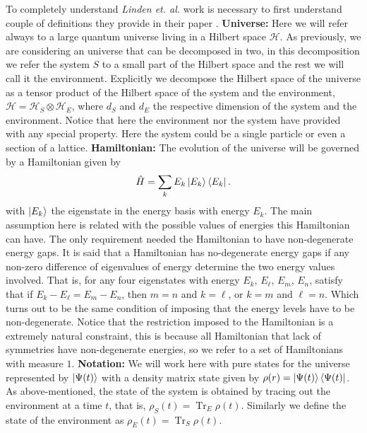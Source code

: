 \newline
To completely understand \textit{Linden et. al.} work is necessary to first understand couple of definitions they provide in their paper  \cite{linden_quantum_2009}.
\newline
\textbf{Universe:} Here we will refer always to a large quantum universe living in a Hilbert space $\mathcal{H}$. As previously, we are considering an universe that can be decomposed in two, in this decomposition we refer the system $S$ to a small part of the Hilbert space and the rest we will call it the environment. Explicitly we decompose the Hilbert space of the universe as a tensor product of the Hilbert space of the system and the environment, $\mathcal{H}=\mathcal{H}_S\otimes \mathcal{H}_E$, where $d_S$ and $d_E$ the respective dimension of the system and the environment. Notice that here the environment nor the system have provided with any special property. Here the system could be a single particle or even a section of a lattice.
\newline
\textbf{Hamiltonian:} The evolution of the universe will be governed by a Hamiltonian given by
\begin{equation}
\hat{H}=\sum_{k}E_k\mathinner{|{E_k}\rangle}\mathinner{\langle{E_k}|}.
\label{CH1:Hamiltonian_universe_linden}
\end{equation}
with $\mathinner{|{E_k}\rangle}$ the eigenstate in the energy basis with energy $E_k$. The main assumption here is related with the possible values of energies this Hamiltonian can have. The only requirement needed the Hamiltonian to have non-degenerate energy gaps.
\newline
It is said that a Hamiltonian has no-degenerate energy gaps if any non-zero difference of eigenvalues of energy determine the two energy values involved. That is, for any four eigenstates with energy $E_k$, $E_\ell$, $E_m$, $E_n$, satisfy that if $E_{k}-E_{\ell}=E_{m}-E_{n}$, then $m=n$ and $k=\ell$, or $k=m$ and $\ell = n$. Which turns out to be the same condition of imposing that the energy levels have to be non-degenerate.\newline
Notice that the restriction imposed to the Hamiltonian is a extremely natural constraint, this is because all Hamiltonian that lack of symmetries have non-degenerate energies, so we refer to a set of Hamiltonians with measure $1$.
\newline
\textbf{Notation:} We will work here with pure states for the universe represented by $\mathinner{|{\Psi(t)}\rangle}$ with a density matrix state given by $\rho(r) =\mathinner{|{\Psi(t)}\rangle}\mathinner{\langle{\Psi(t)}|}$. As above-mentioned, the state of the system is obtained by tracing out the environment at a time $t$, that is, $\rho_S(t)=\operatorname{Tr}_E \rho(t)$. Similarly we define the state of the environment as $\rho_E(t)=\operatorname{Tr}_S \rho(t)$.\newline
